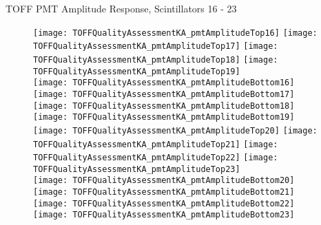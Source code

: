 \documentclass[11pt]{beamer}
\begin{document}
\begin{frame}{TOFF PMT Amplitude Response, Scintillators 16 - 23}
\begin{figure}
\centering
\texttt{[image: TOFFQualityAssessmentKA\_pmtAmplitudeTop16]}
\texttt{[image: TOFFQualityAssessmentKA\_pmtAmplitudeTop17]}
\texttt{[image: TOFFQualityAssessmentKA\_pmtAmplitudeTop18]}
\texttt{[image: TOFFQualityAssessmentKA\_pmtAmplitudeTop19]} \\ 
\texttt{[image: TOFFQualityAssessmentKA\_pmtAmplitudeBottom16]}
\texttt{[image: TOFFQualityAssessmentKA\_pmtAmplitudeBottom17]}
\texttt{[image: TOFFQualityAssessmentKA\_pmtAmplitudeBottom18]}
\texttt{[image: TOFFQualityAssessmentKA\_pmtAmplitudeBottom19]} \\
\texttt{[image: TOFFQualityAssessmentKA\_pmtAmplitudeTop20]}
\texttt{[image: TOFFQualityAssessmentKA\_pmtAmplitudeTop21]}
\texttt{[image: TOFFQualityAssessmentKA\_pmtAmplitudeTop22]}
\texttt{[image: TOFFQualityAssessmentKA\_pmtAmplitudeTop23]} \\
\texttt{[image: TOFFQualityAssessmentKA\_pmtAmplitudeBottom20]}
\texttt{[image: TOFFQualityAssessmentKA\_pmtAmplitudeBottom21]}
\texttt{[image: TOFFQualityAssessmentKA\_pmtAmplitudeBottom22]}
\texttt{[image: TOFFQualityAssessmentKA\_pmtAmplitudeBottom23]} \\
\end{figure}
\end{frame}
\end{document}
